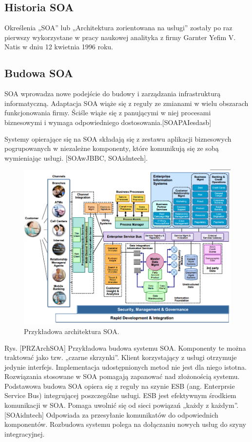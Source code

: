 \subsection{Historia SOA}
Określenia „SOA” lub „Architektura zorientowana na usługi” zostały po raz pierwszy wykorzystane w pracy naukowej analityka z firmy Garnter Yefim V. Natis w dniu 12 kwietnia 1996 roku. 

\subsection{Budowa SOA}
SOA wprowadza nowe podejście do budowy i zarządzania infrastrukturą informatyczną. Adaptacja SOA wiąże się z reguły ze zmianami w wielu obszarach funkcjonowania firmy. Ściśle wiąże się z panującymi w niej procesami biznesowymi i wymaga odpowiedniego dostosowania.[SOAPAIesdasb] 

Systemy opierające się na SOA składają się z zestawu aplikacji biznesowych pogrupowanych w niezależne komponenty, które komunikują się ze sobą wymieniając usługi. [SOAwJBBC, SOAidntech]. 

\begin{figure}[h!tbp]
\begin{centering}
\includegraphics[width=15cm]{img/soa_arch.png}
\caption[Przykładowa architektura SOA.]{Przykładowa architektura SOA. \cite{AnRTeqq}}\label{soa_arch}
\end{centering}
\end{figure}
Rys. [PRZArchSOA] Przykładowa budowa systemu SOA.
Komponenty te można traktować jako tzw. „czarne skrzynki”. Klient korzystający z usługi otrzymuje jedynie interfejs. Implementacja udostępnionych metod nie jest dla niego istotna.
Rozwiązania stosowane w SOA pomagają zapanować nad złożonością systemu. Podstawowa budowa SOA opiera się z reguły na szynie ESB (ang. Enterprsie Service Bus) integrującej poszczególne usługi. ESB jest efektywnym środkiem komunikacji w SOA. Pomaga uwolnić się od sieci powiązań „każdy z każdym”. [SOAidntech] Odpowiada za przesyłanie komunikatów do odpowiednich komponentów. Rozbudowa systemu polega na dołączaniu nowych usług do szyny integracyjnej. 
	
